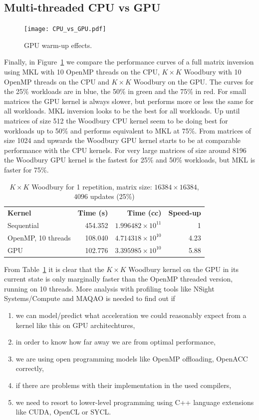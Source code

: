 \documentclass[11pt]{article}
\numberwithin{figure}{section}
\numberwithin{table}{section}
\begin{document}
    \subsection{Multi-threaded CPU vs GPU}
      \begin{figure}
        \centering
        \texttt{[image: CPU\_vs\_GPU.pdf]}
        \caption{GPU warm-up effects.}
        \label{fig:gpu-vs-cpu}
      \end{figure}
      Finally, in Figure~\ref{fig:gpu-vs-cpu} we compare the performance curves of a full matrix inversion using MKL with 10 OpenMP threads on the CPU, $K\times K$ Woodbury with 10 OpenMP threads on the CPU and $K\times K$ Woodbury on the GPU. The curves for the 25\% workloads are in blue, the 50\% in green and the 75\% in red. For small matrices the GPU kernel is always slower, but performs more or less the same for all workloads. MKL inversion looks to be the best for all workloads. Up until matrices of size 512 the Woodbury  CPU kernel seem to be doing best for workloads up to 50\% and performs equivalent to MKL at 75\%. From matrices of size 1024 and upwards the Woodbury GPU kernel starts to be at comparable performance with the CPU kernels. For very large matrices of size around 8196 the Woodbury GPU kernel is the fastest for 25\% and 50\% workloads, but MKL is faster for 75\%.
      \begin{table}[H]
        \centering
        \begin{tabular}{lrrr}
          \textbf{Kernel} & \textbf{Time (s)} & \textbf{Time (cc)} & \textbf{Speed-up}\\
            Sequential & 454.352 & $1.996482\times10^{11}$ & 1\\
            OpenMP, 10 threads & 108.040 & $4.714318\times10^{10}$ & 4.23\\
            GPU & 102.776 & $3.395985\times10^{10}$ & 5.88
        \end{tabular}
        \caption{$K\!\times\!K$ Woodbury for 1 repetition, matrix size: $16384\times16384$, $4096$ updates (25\%)}
        \label{tab:cpu-vs-gpu}
      \end{table}
      From Table~\ref{tab:cpu-vs-gpu} it is clear that the $K\!\times\!K$ Woodbury kernel on the GPU in its current state is only marginally faster than the OpenMP threaded version, running on 10 threads. More analysis with profiling tools like NSight Systems/Compute and MAQAO is needed to find out if
      \begin{enumerate}
        \item we can model/predict what acceleration we could reasonably expect from a kernel like this on GPU architechtures,
        \item in order to know how far away we are from optimal performance,
        \item we are using open programming models like OpenMP offloading, OpenACC correctly,
        \item if there are problems with their implementation in the used compilers,
        \item we need to resort to lower-level programming using C++ language extensions like CUDA, OpenCL or SYCL.
      \end{enumerate}
\end{document}
